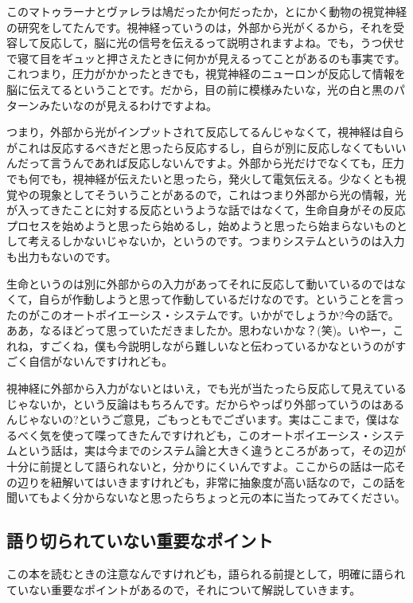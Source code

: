 \documentclass{ltjsbook}
\begin{document}
このマトゥラーナとヴァレラは鳩だったか何だったか，とにかく動物の視覚神経の研究をしてたんです。視神経っていうのは，外部から光がくるから，それを受容して反応して，脳に光の信号を伝えるって説明されますよね。でも，うつ伏せで寝て目をギュッと押さえたときに何かが見えるってことがあるのも事実です。これつまり，圧力がかかったときでも，視覚神経のニューロンが反応して情報を脳に伝えてるということです。だから，目の前に模様みたいな，光の白と黒のパターンみたいなのが見えるわけですよね。

つまり，外部から光がインプットされて反応してるんじゃなくて，視神経は自らがこれは反応するべきだと思ったら反応するし，自らが別に反応しなくてもいいんだって言うんであれば反応しないんですよ。外部から光だけでなくても，圧力でも何でも，視神経が伝えたいと思ったら，発火して電気伝える。少なくとも視覚やの現象としてそういうことがあるので，これはつまり外部から光の情報，光が入ってきたことに対する反応というような話ではなくて，生命自身がその反応プロセスを始めようと思ったら始めるし，始めようと思ったら始まらないものとして考えるしかないじゃないか，というのです。つまりシステムというのは入力も出力もないのです。

生命というのは別に外部からの入力があってそれに反応して動いているのではなくて，自らが作動しようと思って作動しているだけなのです。ということを言ったのがこのオートポイエーシス・システムです。いかがでしょうか?今の話で。ああ，なるほどって思っていただきましたか。思わないかな？(笑)。いやー，これね，すごくね，僕も今説明しながら難しいなと伝わっているかなというのがすごく自信がないんですけれども。

視神経に外部から入力がないとはいえ，でも光が当たったら反応して見えているじゃないか，という反論はもちろんです。だからやっぱり外部っていうのはあるんじゃないの?というご意見，ごもっともでございます。実はここまで，僕はなるべく気を使って喋ってきたんですけれども，このオートポイエーシス・システムという話は，実は今までのシステム論と大きく違うところがあって，その辺が十分に前提として語られないと，分かりにくいんですよ。ここからの話は一応その辺りを紐解いてはいきますけれども，非常に抽象度が高い話なので，この話を聞いてもよく分からないなと思ったらちょっと元の本に当たってみてください。

\subsection{語り切られていない重要なポイント}

この本を読むときの注意なんですけれども，語られる前提として，明確に語られていない重要なポイントがあるので，それについて解説していきます。
\end{document}

